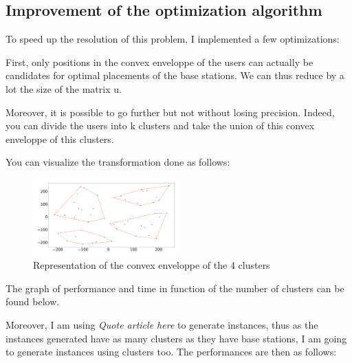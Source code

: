 \documentclass[letterpaper]{article}
\begin{document}
\subsection{Improvement of the optimization algorithm}

To speed up the resolution of this problem, I implemented a few optimizations:

First, only positions in the convex enveloppe of the users can actually be candidates for optimal placements of the base stations.
We can thus reduce by a lot the size of the matrix u.

Moreover, it is possible to go further but not without losing precision.
Indeed, you can divide the users into k clusters and take the union of this convex enveloppe of this clusters.

You can visualize the transformation done as follows:

\begin{figure}[H]
    \centering
    \includegraphics[width=0.5\textwidth]{images/four_cluster.png}
    \caption{Representation of the convex enveloppe of the 4 clusters}
\end{figure}

The graph of performance and time in function of the number of clusters can be found below.

Moreover, I am using \textit{Quote article here} to generate instances, thus as the instances generated have as many
clusters as they have base stations, I am going to generate instances using clusters too.
The performances are then as follows:
\end{document}
